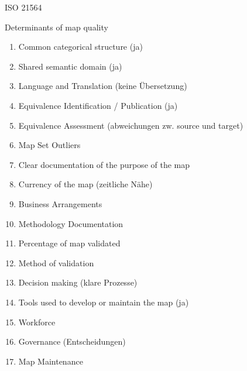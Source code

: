 ISO 21564

Determinants of map quality

\begin{enumerate}
\item Common categorical structure (ja)
\item Shared semantic domain (ja)
\item Language and Translation (keine Übersetzung)
\item Equivalence Identification / Publication (ja)
\item Equivalence Assessment (abweichungen zw. source und target)
\item Map Set Outliers
\item Clear documentation of the purpose of the map
\item Currency of the map (zeitliche Nähe)
\item Business Arrangements
\item Methodology Documentation
\item Percentage of map validated
\item Method of validation
\item Decision making (klare Prozesse)
\item Tools used to develop or maintain the map (ja)
\item Workforce
\item Governance (Entscheidungen)
\item Map Maintenance
\end{enumerate}


